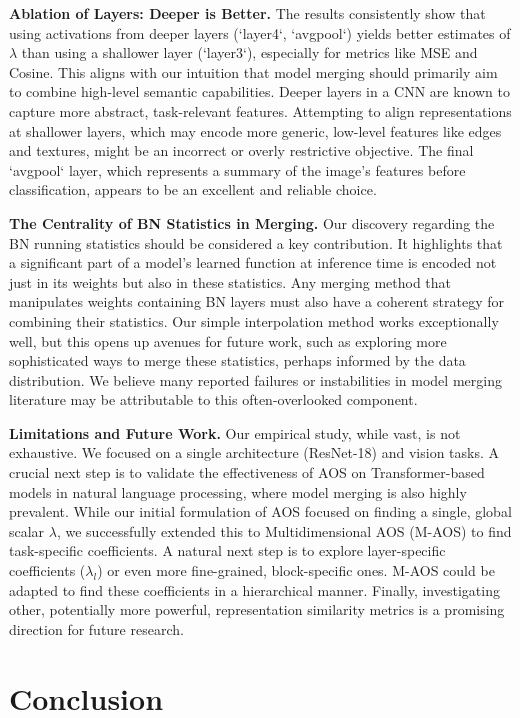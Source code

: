 \documentclass{article}
\theoremstyle{plain}
\theoremstyle{definition}
\theoremstyle{remark}
\begin{document}
\textbf{Ablation of Layers: Deeper is Better.} The results consistently show that using activations from deeper layers (`layer4`, `avgpool`) yields better estimates of $\lambda$ than using a shallower layer (`layer3`), especially for metrics like MSE and Cosine. This aligns with our intuition that model merging should primarily aim to combine high-level semantic capabilities. Deeper layers in a CNN are known to capture more abstract, task-relevant features. Attempting to align representations at shallower layers, which may encode more generic, low-level features like edges and textures, might be an incorrect or overly restrictive objective. The final `avgpool` layer, which represents a summary of the image's features before classification, appears to be an excellent and reliable choice.

\textbf{The Centrality of BN Statistics in Merging.} Our discovery regarding the BN running statistics should be considered a key contribution. It highlights that a significant part of a model's learned function at inference time is encoded not just in its weights but also in these statistics. Any merging method that manipulates weights containing BN layers must also have a coherent strategy for combining their statistics. Our simple interpolation method works exceptionally well, but this opens up avenues for future work, such as exploring more sophisticated ways to merge these statistics, perhaps informed by the data distribution. We believe many reported failures or instabilities in model merging literature may be attributable to this often-overlooked component.

\textbf{Limitations and Future Work.} Our empirical study, while vast, is not exhaustive. We focused on a single architecture (ResNet-18) and vision tasks. A crucial next step is to validate the effectiveness of AOS on Transformer-based models in natural language processing, where model merging is also highly prevalent. While our initial formulation of AOS focused on finding a single, global scalar $\lambda$, we successfully extended this to Multidimensional AOS (M-AOS) to find task-specific coefficients. A natural next step is to explore layer-specific coefficients ($\lambda_l$) or even more fine-grained, block-specific ones. M-AOS could be adapted to find these coefficients in a hierarchical manner. Finally, investigating other, potentially more powerful, representation similarity metrics is a promising direction for future research.

\section{Conclusion}
\end{document}
